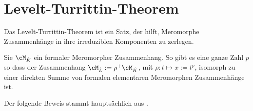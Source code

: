 \section{Levelt-\!Turrittin-\!Theorem}
Das Levelt-Turrittin-Theorem ist ein Satz, der hilft, Meromorphe Zusammenhänge
in ihre irreduziblen Komponenten zu zerlegen.

\begin{comment}
\subsection{Klassische Version}
\end{comment}
\begin{thm}
\cite[Thm 5.4.7]{sabbah_cimpa90}
Sie $\cM_{\hat K}$ ein formaler Meromorpher Zusammenhang. So gibt es eine
ganze Zahl $p$ so dass der Zusammenhang $\cM_{\hat L}:=\rho^+\cM_{\hat K}$,
mit $\rho:t\mapsto x:=t^p$, isomorph zu einer direkten Summe von formalen
elementaren Meromorphen Zusammenhänge
ist.
\end{thm}
Der folgende Beweis stammt hauptsächlich aus \cite[Seite 35]{sabbah_cimpa90}.

